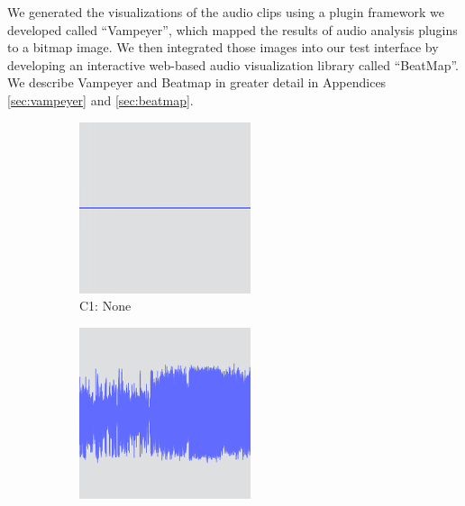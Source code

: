 We generated the visualizations of the audio clips using a plugin framework we developed called ``Vampeyer'', which
mapped the results of audio analysis plugins to a bitmap image. We then integrated those images into our test interface
by developing an interactive web-based audio visualization library called ``BeatMap''.  We describe Vampeyer and
Beatmap in greater detail in Appendices \ref{sec:vampeyer} and \ref{sec:beatmap}.

\begin{figure}[p]
  \centering
  \begin{subfigure}{.3\textwidth}
    \centering
    \includegraphics[width=\columnwidth]{figs/condition1.png}
    \caption{C1: None}
  \end{subfigure}
  \begin{subfigure}{.3\textwidth}
    \centering
    \includegraphics[width=\columnwidth]{figs/condition2.png}

\end{subfigure}
\end{figure}
